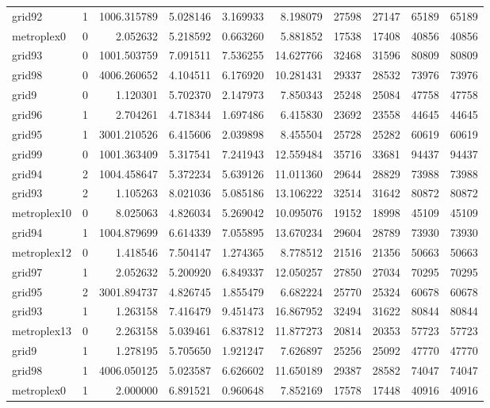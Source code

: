 \begin{longtable}{|l|r|r|r|r|r|r|r|r|r|}
grid92 & 1 & 1006.315789 & 5.028146 & 3.169933 & 8.198079 & 27598 & 27147 & 65189 & 65189 \\
metroplex0 & 0 & 2.052632 & 5.218592 & 0.663260 & 5.881852 & 17538 & 17408 & 40856 & 40856 \\
grid93 & 0 & 1001.503759 & 7.091511 & 7.536255 & 14.627766 & 32468 & 31596 & 80809 & 80809 \\
grid98 & 0 & 4006.260652 & 4.104511 & 6.176920 & 10.281431 & 29337 & 28532 & 73976 & 73976 \\
grid9 & 0 & 1.120301 & 5.702370 & 2.147973 & 7.850343 & 25248 & 25084 & 47758 & 47758 \\
grid96 & 1 & 2.704261 & 4.718344 & 1.697486 & 6.415830 & 23692 & 23558 & 44645 & 44645 \\
grid95 & 1 & 3001.210526 & 6.415606 & 2.039898 & 8.455504 & 25728 & 25282 & 60619 & 60619 \\
grid99 & 0 & 1001.363409 & 5.317541 & 7.241943 & 12.559484 & 35716 & 33681 & 94437 & 94437 \\
grid94 & 2 & 1004.458647 & 5.372234 & 5.639126 & 11.011360 & 29644 & 28829 & 73988 & 73988 \\
grid93 & 2 & 1.105263 & 8.021036 & 5.085186 & 13.106222 & 32514 & 31642 & 80872 & 80872 \\
metroplex10 & 0 & 8.025063 & 4.826034 & 5.269042 & 10.095076 & 19152 & 18998 & 45109 & 45109 \\
grid94 & 1 & 1004.879699 & 6.614339 & 7.055895 & 13.670234 & 29604 & 28789 & 73930 & 73930 \\
metroplex12 & 0 & 1.418546 & 7.504147 & 1.274365 & 8.778512 & 21516 & 21356 & 50663 & 50663 \\
grid97 & 1 & 2.052632 & 5.200920 & 6.849337 & 12.050257 & 27850 & 27034 & 70295 & 70295 \\
grid95 & 2 & 3001.894737 & 4.826745 & 1.855479 & 6.682224 & 25770 & 25324 & 60678 & 60678 \\
grid93 & 1 & 1.263158 & 7.416479 & 9.451473 & 16.867952 & 32494 & 31622 & 80844 & 80844 \\
metroplex13 & 0 & 2.263158 & 5.039461 & 6.837812 & 11.877273 & 20814 & 20353 & 57723 & 57723 \\
grid9 & 1 & 1.278195 & 5.705650 & 1.921247 & 7.626897 & 25256 & 25092 & 47770 & 47770 \\
grid98 & 1 & 4006.050125 & 5.023587 & 6.626602 & 11.650189 & 29387 & 28582 & 74047 & 74047 \\
metroplex0 & 1 & 2.000000 & 6.891521 & 0.960648 & 7.852169 & 17578 & 17448 & 40916 & 40916 \\

\end{longtable}
